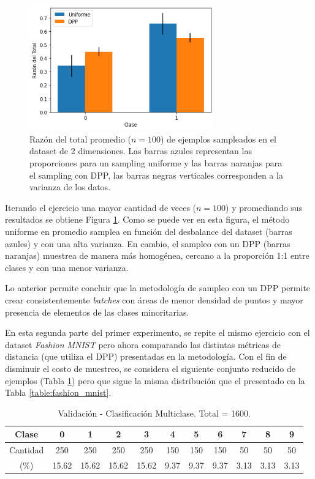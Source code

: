 \begin{figure}[ht]
    \centering
    \includegraphics[width=8cm]{img/tesis/resultados/sampling_n_2.png}
    \caption{Razón del total promedio ($n=100$) de ejemplos sampleados en el dataset de 2 dimensiones. Las barras azules representan las proporciones para un sampling uniforme y las barras naranjas para el sampling con DPP, las barras negras verticales corresponden a la varianza de los datos.}
    \label{fig:proporcion_sampling}
\end{figure}

Iterando el ejercicio una mayor cantidad de veces ($n=100$) y promediando sus resultados se obtiene Figura \ref{fig:proporcion_sampling}. Como se puede ver en esta figura, el método uniforme en promedio samplea en función del desbalance del dataset (barras azules) y con una alta varianza. En cambio, el sampleo con un DPP (barras naranjas) muestrea de manera más homogénea, cercano a la proporción 1:1 entre clases y con una menor varianza. 

\vspace{0.2cm}

Lo anterior permite concluir que la metodología de sampleo con un DPP permite crear consistentemente \textit{batches} con áreas de menor densidad de puntos y mayor presencia de elementos de las clases minoritarias. 

\vspace{0.2cm}

En esta segunda parte del primer experimento, se repite el mismo ejercicio con el dataset \textit{Fashion MNIST} pero ahora comparando las distintas métricas de distancia (que utiliza el DPP) presentadas en la metodología. Con el fin de disminuir el costo de muestreo, se considera el siguiente conjunto reducido de ejemplos (Tabla \ref{table:fashion_mnist_val}) pero que sigue la misma distribución que el presentado en la Tabla \ref{table:fashion_mnist}.

\begin{table}[ht]
\begin{tabular}{|c|c|c|c|c|c|c|c|c|c|c|}
\hline
Clase    & 0    & 1    & 2    & 3    & 4    & 5    & 6   & 7   & 8   & 9   \\ \hline
Cantidad & 250 & 250 & 250 & 250 & 150 & 150 & 150 & 50 & 50 & 50 \\ \hline
(\%) & 15.62 & 15.62 & 15.62 & 15.62 & 9.37 & 9.37 & 9.37 & 3.13 & 3.13 & 3.13 \\ \hline
\end{tabular}
\caption{Validación - Clasificación Multiclase. Total = 1600.}
\label{table:fashion_mnist_val}
\end{table}

